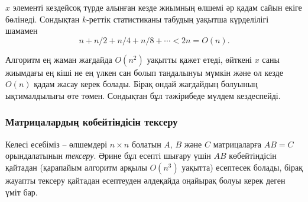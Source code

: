 
$x$ элементі кездейсоқ түрде алынған кезде 
жиымның өлшемі әр қадам сайын екіге бөлінеді.
Сондықтан $k$-реттік статистиканы табудың уақытша 
күрделілігі шамамен 
\[n+n/2+n/4+n/8+\cdots < 2n = O(n).\]


Алгоритм ең жаман жағдайда $O(n^2)$ уақытты қажет етеді,
өйткені $x$ саны жиымдағы ең кіші не ең үлкен сан болып 
таңдалынуы мүмкін және ол кезде $O(n)$ қадам жасау керек болады.
Бірақ ондай жағдайдың болуының ықтималдылығы өте төмен.
Сондықтан бұл тәжірибеде мүлдем кездеспейді. 


\subsubsection{Матрицалардың көбейтіндісін тексеру}


Келесі есебіміз -- өлшемдері $n \times n$ болатын
$A$, $B$ және $C$ матрицаларға $AB=C$ орындалатынын 
\emph{тексеру}. 
Әрине бұл есепті шығару үшін 
$AB$ көбейтіндісін қайтадан (қарапайым алгоритм арқылы $O(n^3)$ уақытта) есептесек болады, бірақ жауапты тексеру 
қайтадан есептеуден әлдеқайда оңайырақ болуы керек
деген үміт бар. 


